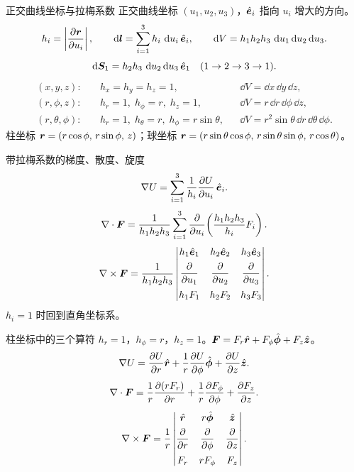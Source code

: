 \begin{frame}{正交曲线坐标与拉梅系数}
正交曲线坐标 $(u_1,u_2,u_3)$，$\hat{\bm{e}}_i$ 指向 $u_i$ 增大的方向。
\[
h_i=\left|\frac{\partial\bm{r}}{\partial u_i}\right|,\qquad
\mathop{}\!\mathrm d\bm{l}=\sum_{i=1}^{3}h_i\,\mathop{}\!\mathrm d u_i\,\hat{\bm{e}}_i,\qquad
\mathop{}\!\mathrm d V=h_1 h_2 h_3\,\mathop{}\!\mathrm d u_1\mathop{}\!\mathrm d u_2\mathop{}\!\mathrm d u_3.
\]
\[
\mathop{}\!\mathrm d\bm{S}_1=h_2 h_3\,\mathop{}\!\mathrm d u_2\mathop{}\!\mathrm d u_3\,\hat{\bm{e}}_1
\quad(1\to2\to3\to1).
\]
\[
\begin{aligned}
(x,y,z):&\quad h_x=h_y=h_z=1, && \dd V=\dd x\,\dd y\,\dd z,\\
(r,\phi,z):&\quad h_r=1,\; h_\phi=r,\; h_z=1, && \dd V=r\,\dd r\,\dd\phi\,\dd z,\\
(r,\theta,\phi):&\quad h_r=1,\; h_\theta=r,\; h_\phi=r\sin\theta, && \dd V=r^2\sin\theta\,\dd r\,\dd\theta\,\dd\phi.
\end{aligned}
\]
柱坐标 $\bm{r}=(r\cos\phi,\,r\sin\phi,\,z)$；球坐标 $\bm{r}=(r\sin\theta\cos\phi,\,r\sin\theta\sin\phi,\,r\cos\theta)$。
\end{frame}

\begin{frame}{带拉梅系数的梯度、散度、旋度}
\[
\nabla U=\sum_{i=1}^{3}\frac{1}{h_i}\frac{\partial U}{\partial u_i}\,\hat{\bm{e}}_i.
\]
\[
\nabla\cdot\bm{F}=\frac{1}{h_1 h_2 h_3}\sum_{i=1}^{3}
\frac{\partial}{\partial u_i}\!\left(\frac{h_1 h_2 h_3}{h_i}F_i\right).
\]
\[
\nabla\times\bm{F}=\frac{1}{h_1 h_2 h_3}
\begin{vmatrix}
h_1\hat{\bm{e}}_1&h_2\hat{\bm{e}}_2&h_3\hat{\bm{e}}_3\\[4pt]
\dfrac{\partial}{\partial u_1}&\dfrac{\partial}{\partial u_2}&\dfrac{\partial}{\partial u_3}\\[10pt]
h_1 F_1&h_2 F_2&h_3 F_3
\end{vmatrix}.
\]
$h_i=1$ 时回到直角坐标系。
\end{frame}

\begin{frame}{柱坐标中的三个算符}
$h_r=1$，$h_\phi=r$，$h_z=1$。$\bm{F}=F_r\hat{\bm{r}}+F_\phi\hat{\bm{\phi}}+F_z\hat{\bm{z}}$。
\[
\nabla U=\frac{\partial U}{\partial r}\hat{\bm{r}}+\frac{1}{r}\frac{\partial U}{\partial\phi}\hat{\bm{\phi}}+\frac{\partial U}{\partial z}\hat{\bm{z}}.
\]
\[
\nabla\cdot\bm{F}=\frac{1}{r}\frac{\partial(r F_r)}{\partial r}+\frac{1}{r}\frac{\partial F_\phi}{\partial\phi}+\frac{\partial F_z}{\partial z}.
\]
\[
\nabla\times\bm{F}=\frac{1}{r}
\begin{vmatrix}
\hat{\bm{r}}&r\hat{\bm{\phi}}&\hat{\bm{z}}\\[4pt]
\dfrac{\partial}{\partial r}&\dfrac{\partial}{\partial\phi}&\dfrac{\partial}{\partial z}\\[10pt]
F_r&r F_\phi&F_z
\end{vmatrix}.
\]
\end{frame}


